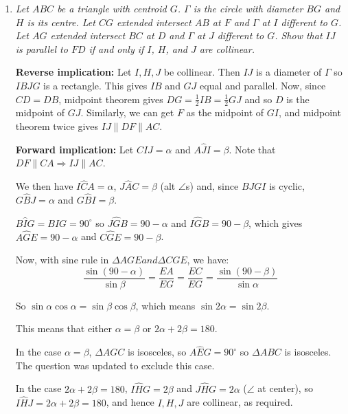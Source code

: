 \documentclass{article}
\begin{document}
\begin{enumerate}[1.]
\vspace{24pt}
\item %
{\itshape Let $ABC$ be a triangle with centroid $G$.
$\Gamma$ is the circle with diameter $BG$ and $H$ is its centre.
Let $CG$ extended intersect $AB$ at $F$ and $\Gamma$ at $I$ different to $G$.
Let $AG$ extended intersect $BC$ at $D$ and $\Gamma$ at $J$ different to $G$. Show that $IJ$ is parallel to $FD$ if and only if $I$, $H$, and $J$ are collinear.}

\textbf{Reverse implication:}
Let $I,H,J$ be collinear. Then $IJ$ is a diameter of $\Gamma$ so $IBJG$ is a rectangle. This gives $IB$ and $GJ$ equal and parallel. Now, since $CD=DB$, midpoint theorem gives $DG=\frac{1}{2}IB = \frac{1}{2}GJ$ and so $D$ is the midpoint of $GJ$. Similarly, we can get $F$ as the midpoint of $GI$, and midpoint theorem twice gives $IJ \parallel DF \parallel AC$.


\textbf{Forward implication:}
Let $C\hat{I}J=\alpha$ and $A\hat{J}I=\beta$. Note that $DF\parallel CA\Rightarrow IJ\parallel AC$.

We then have $I\hat{C}A=\alpha$, $J\hat{A}C=\beta$ (alt $\angle$s) and, since $BJGI$ is cyclic, $G\hat{B}J=\alpha$ and $G\hat{B}I=\beta$.

$B\hat{I}G=B\hat{I}G=90^{\circ}$ so $J\hat{G}B=90-\alpha$ and $I\hat{G}B=90-\beta$, which gives $A\hat{G}E=90-\alpha$ and $C\hat{G}E=90-\beta$.

Now, with sine rule in $\Delta AGE and \Delta CGE$, we have:
$$\frac{\sin{(90-\alpha)}}{\sin{\beta}}=\frac{EA}{EG}=\frac{EC}{EG}=\frac{\sin{(90-\beta)}}{\sin{\alpha}}$$

So $\sin{\alpha}\cos{\alpha}=\sin{\beta}\cos{\beta}$, which means $\sin{2\alpha} = \sin{2\beta}$.

This means that either $\alpha=\beta$ or $2\alpha+2\beta = 180$.

In the case $\alpha=\beta$, $\Delta AGC$ is isosceles, so $A\hat{E}G=90^{\circ}$ so $\Delta ABC$ is isosceles. The question was updated to exclude this case.

In the case $2\alpha+2\beta = 180$, $I\hat{H}G=2\beta$ and $J\hat{H}G=2\alpha$ ($\angle$ at center), so $I\hat{H}J = 2\alpha+2\beta = 180$, and hence $I,H,J$ are collinear, as required.


\end{enumerate}
\end{document}
